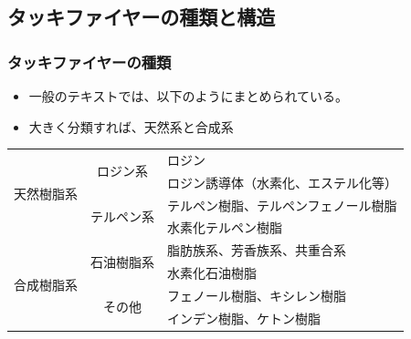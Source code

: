 \documentclass[unicode,12pt]{beamer}%
\begin{document}
\subsection{タッキファイヤーの種類と構造}
\begin{frame}
	\frametitle{タッキファイヤーの種類}
		\begin{itemize}
			\item 一般のテキストでは、以下のようにまとめられている。
			\item 大きく分類すれば、天然系と合成系
		\end{itemize}
	\begin{table}[tb]
		\scriptsize
		\centering
			\begin{tabular}{ccl}
				\toprule
				\multirow{4}{*}{天然樹脂系}	&\multirow{2}{*}{ロジン系}&ロジン \\
											&	&ロジン誘導体（水素化、エステル化等） \\
											\cmidrule(lr){2-3}
											&\multirow{2}{*}{テルペン系}& テルペン樹脂、テルペンフェノール樹脂\\ 
											& & 水素化テルペン樹脂 \\
				\midrule
				\multirow{4}{*}{合成樹脂系} &\multirow{2}{*}{石油樹脂系}& 脂肪族系、芳香族系、共重合系 \\ 
											&	& 水素化石油樹脂 \\
											\cmidrule(lr){2-3}
											&\multirow{2}{*}{その他}& フェノール樹脂、キシレン樹脂 \\
											&	&インデン樹脂、ケトン樹脂\\ 
				\bottomrule
			\end{tabular}
	\end{table}
\end{frame}
\end{document}
